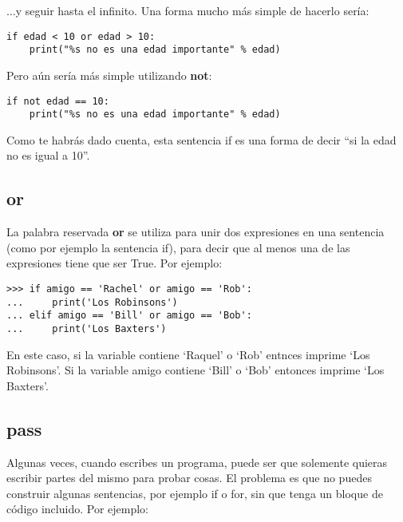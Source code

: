 \begin{listing}
\noindent
$\ldots$y seguir hasta el infinito. Una forma mucho más simple de hacerlo sería:

\begin{listing}
\begin{verbatim}
if edad < 10 or edad > 10:
    print("%s no es una edad importante" % edad)
\end{verbatim}
\end{listing}

\noindent
Pero aún sería más simple utilizando \textbf{not}:

\begin{listing}
\begin{verbatim}
if not edad == 10:
    print("%s no es una edad importante" % edad)
\end{verbatim}
\end{listing}

\noindent
Como te habrás dado cuenta, esta sentencia if es una forma de decir ``si la edad no es igual a 10''.

\subsection*{or}

La palabra reservada \textbf{or} se utiliza para unir dos expresiones en una sentencia (como por ejemplo la sentencia if), para decir que al menos una de las expresiones tiene que ser True. Por ejemplo:

\begin{listingignore}
\begin{verbatim}
>>> if amigo == 'Rachel' or amigo == 'Rob':
...     print('Los Robinsons')
... elif amigo == 'Bill' or amigo == 'Bob':
...     print('Los Baxters')
\end{verbatim}
\end{listingignore}

En este caso, si la variable  contiene `Raquel' o `Rob' entnces imprime `Los Robinsons'.  Si la variable amigo contiene `Bill' o `Bob' entonces imprime `Los Baxters'.

\subsection*{pass}

Algunas veces, cuando escribes un programa, puede ser que solemente quieras escribir partes del mismo para probar cosas.  El problema es que no puedes construir algunas sentencias, por ejemplo if o for, sin que tenga un bloque de código incluido. Por ejemplo:


\end{listing}
